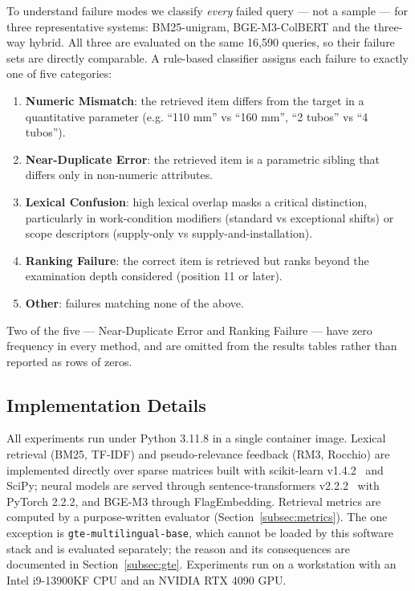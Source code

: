 \documentclass[preprint,review,12pt]{elsarticle}
\begin{document}
To understand failure modes we classify \emph{every} failed query --- not a sample --- for three representative systems: BM25-unigram, BGE-M3-ColBERT and the three-way hybrid. All three are evaluated on the same 16,590 queries, so their failure sets are directly comparable. A rule-based classifier assigns each failure to exactly one of five categories:

\begin{enumerate}
    \item \textbf{Numeric Mismatch}: the retrieved item differs from the target in a quantitative parameter (e.g. ``110 mm'' vs ``160 mm'', ``2 tubos'' vs ``4 tubos'').

    \item \textbf{Near-Duplicate Error}: the retrieved item is a parametric sibling that differs only in non-numeric attributes.

    \item \textbf{Lexical Confusion}: high lexical overlap masks a critical distinction, particularly in work-condition modifiers (standard vs exceptional shifts) or scope descriptors (supply-only vs supply-and-installation).

    \item \textbf{Ranking Failure}: the correct item is retrieved but ranks beyond the examination depth considered (position 11 or later).

    \item \textbf{Other}: failures matching none of the above.
\end{enumerate}

Two of the five --- Near-Duplicate Error and Ranking Failure --- have zero frequency in every method, and are omitted from the results tables rather than reported as rows of zeros.

\subsection{Implementation Details}
\label{subsec:implementation}

All experiments run under Python 3.11.8 in a single container image. Lexical retrieval (BM25, TF-IDF) and pseudo-relevance feedback (RM3, Rocchio) are implemented directly over sparse matrices built with scikit-learn v1.4.2~\citep{pedregosa2011scikit} and SciPy; neural models are served through sentence-transformers v2.2.2~\citep{reimers2019sentence} with PyTorch 2.2.2, and BGE-M3 through FlagEmbedding. Retrieval metrics are computed by a purpose-written evaluator (Section~\ref{subsec:metrics}). The one exception is \texttt{gte-multilingual-base}, which cannot be loaded by this software stack and is evaluated separately; the reason and its consequences are documented in Section~\ref{subsec:gte}. Experiments run on a workstation with an Intel i9-13900KF CPU and an NVIDIA RTX 4090 GPU.
\end{document}
